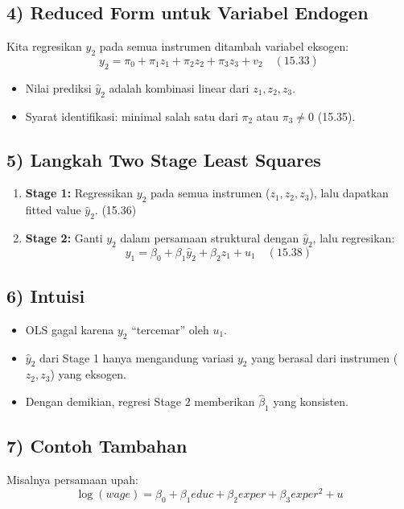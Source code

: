 \documentclass[]{article}
\begin{document}
\subsection*{4) Reduced Form untuk Variabel Endogen}
Kita regresikan $y_2$ pada semua instrumen ditambah variabel eksogen:
\[
y_2 = \pi_0 + \pi_1 z_1 + \pi_2 z_2 + \pi_3 z_3 + v_2 \quad (15.33)
\]

\begin{itemize}
    \item Nilai prediksi $\hat{y}_2$ adalah kombinasi linear dari $z_1, z_2, z_3$.
    \item Syarat identifikasi: minimal salah satu dari $\pi_2$ atau $\pi_3 \neq 0$ (15.35).
\end{itemize}

\subsection*{5) Langkah Two Stage Least Squares}
\begin{enumerate}
    \item \textbf{Stage 1:} Regressikan $y_2$ pada semua instrumen ($z_1, z_2, z_3$), lalu dapatkan fitted value $\hat{y}_2$. (15.36)
    \item \textbf{Stage 2:} Ganti $y_2$ dalam persamaan struktural dengan $\hat{y}_2$, lalu regresikan:
    \[
    y_1 = \beta_0 + \beta_1 \hat{y}_2 + \beta_2 z_1 + u_1 \quad (15.38)
    \]
\end{enumerate}

\subsection*{6) Intuisi}
\begin{itemize}
    \item OLS gagal karena $y_2$ ``tercemar'' oleh $u_1$.
    \item $\hat{y}_2$ dari Stage 1 hanya mengandung variasi $y_2$ yang berasal dari instrumen ($z_2, z_3$) yang eksogen.
    \item Dengan demikian, regresi Stage 2 memberikan $\hat{\beta}_1$ yang konsisten.
\end{itemize}

\subsection*{7) Contoh Tambahan}
Misalnya persamaan upah:
\[
\log(wage) = \beta_0 + \beta_1 educ + \beta_2 exper + \beta_3 exper^2 + u
\]
\end{document}

